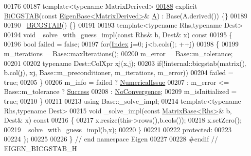 \begin{DoxyCode}
00176 
00187   \textcolor{keyword}{template}<\textcolor{keyword}{typename} MatrixDerived>
\hyperlink{group___iterative_linear_solvers___module_a5842afd9566e254bc727de1fd7f46362}{00188}   \textcolor{keyword}{explicit} \hyperlink{group___iterative_linear_solvers___module_a5842afd9566e254bc727de1fd7f46362}{BiCGSTAB}(\textcolor{keyword}{const} \hyperlink{group___core___module_struct_eigen_1_1_eigen_base}{EigenBase<MatrixDerived>}& 
      \hyperlink{group___core___module_class_eigen_1_1_matrix}{A}) : Base(A.derived()) \{\}
00189 
00190   ~\hyperlink{group___iterative_linear_solvers___module_class_eigen_1_1_bi_c_g_s_t_a_b}{BiCGSTAB}() \{\}
00191 
00193   \textcolor{keyword}{template}<\textcolor{keyword}{typename} Rhs,\textcolor{keyword}{typename} Dest>
00194   \textcolor{keywordtype}{void} \_solve\_with\_guess\_impl(\textcolor{keyword}{const} Rhs& b, Dest& x)\textcolor{keyword}{ const}
00195 \textcolor{keyword}{  }\{    
00196     \textcolor{keywordtype}{bool} failed = \textcolor{keyword}{false};
00197     \textcolor{keywordflow}{for}(\hyperlink{namespace_eigen_a62e77e0933482dafde8fe197d9a2cfde}{Index} j=0; j<b.cols(); ++j)
00198     \{
00199       m\_iterations = Base::maxIterations();
00200       m\_error = Base::m\_tolerance;
00201       
00202       \textcolor{keyword}{typename} Dest::ColXpr xj(x,j);
00203       \textcolor{keywordflow}{if}(!internal::bicgstab(matrix(), b.col(j), xj, Base::m\_preconditioner, m\_iterations, m\_error))
00204         failed = \textcolor{keyword}{true};
00205     \}
00206     m\_info = failed ? \hyperlink{group__enums_gga85fad7b87587764e5cf6b513a9e0ee5eaaf9b736d310a664e7729d163a035cc5f}{NumericalIssue}
00207            : m\_error <= Base::m\_tolerance ? \hyperlink{group__enums_gga85fad7b87587764e5cf6b513a9e0ee5ea52581b035f4b59c203b8ff999ef5fcea}{Success}
00208            : \hyperlink{group__enums_gga85fad7b87587764e5cf6b513a9e0ee5eaba1c8763d1179778070f365ecc4157a8}{NoConvergence};
00209     m\_isInitialized = \textcolor{keyword}{true};
00210   \}
00211 
00213   \textcolor{keyword}{using} Base::\_solve\_impl;
00214   \textcolor{keyword}{template}<\textcolor{keyword}{typename} Rhs,\textcolor{keyword}{typename} Dest>
00215   \textcolor{keywordtype}{void} \_solve\_impl(\textcolor{keyword}{const} \hyperlink{group___core___module_class_eigen_1_1_matrix_base}{MatrixBase<Rhs>}& b, Dest& x)\textcolor{keyword}{ const}
00216 \textcolor{keyword}{  }\{
00217     x.resize(this->rows(),b.cols());
00218     x.setZero();
00219     \_solve\_with\_guess\_impl(b,x);
00220   \}
00221 
00222 \textcolor{keyword}{protected}:
00223 
00224 \};
00225 
00226 \} \textcolor{comment}{// end namespace Eigen}
00227 
00228 \textcolor{preprocessor}{#endif // EIGEN\_BICGSTAB\_H}
\end{DoxyCode}

